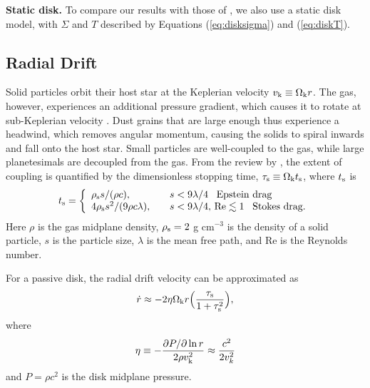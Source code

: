 \documentclass[apj]{emulateapj}
\begin{document}
\textbf{Static disk.} To compare our results with those of \citet{oberg11}, we also use a static disk model, with $\Sigma$ and $T$ described by Equations (\ref{eq:disksigma}) and (\ref{eq:diskT}). %


\subsection{Radial Drift}
\label{sec:drift}

Solid particles orbit their host star at the Keplerian velocity $v_{\rm k} \equiv \Omega_{\rm k} r$. The gas, however, experiences an additional pressure gradient, which causes it to rotate at sub-Keplerian velocity \citep{weidenschilling77}. Dust grains that are large enough thus experience a headwind, which removes angular momentum, causing the solids to spiral inwards and fall onto the host star. Small particles are well-coupled to the gas, while large planetesimals are decoupled from the gas. From the review by \citet{chiang10}, the extent of coupling is quantified by the dimensionless stopping time, $\tau_{\rm s} \equiv \Omega_{\rm k} t_{\rm s}$, where $t_{\rm s}$ is
\begin{equation}
\label{eq:ts}
t_{\rm s}= \left\{
\begin{array}{l l}
\rho_{\rm s} s / (\rho c), & \quad s < 9 \lambda/4 \,\,\,\ \text{Epstein drag} \\
4 \rho_{\rm s} s^2 / (9 \rho c \lambda), & \quad s < 9 \lambda/4, \,\text{Re} \lesssim 1 \,\,\,\ \text{Stokes drag.}
\end{array} 
\right.
\end{equation}
Here $\rho$ is the gas midplane density, $\rho_{\rm s}=2$ g cm$^{-3}$ is the density of a solid particle, $s$ is the particle size, $\lambda$ is the mean free path, and Re is the Reynolds number. 

For a passive disk, the radial drift velocity can be approximated as
\begin{equation}
\label{eq:rdotpas}
\dot{r} \approx -2 \eta \Omega_{\rm k} r \Big(\frac{\tau_{\rm s}}{1+\tau_{\rm s}^2}\Big),
\end{equation}
where
\begin{equation}
\label{eq:eta}
\eta \equiv - \frac{\partial P/\partial \ln r}{2 \rho v_{\rm k}^2} \approx \frac{c^2}{2 v_k^2}
\end{equation}
and $P = \rho c^2$ is the disk midplane pressure. 
\end{document}
